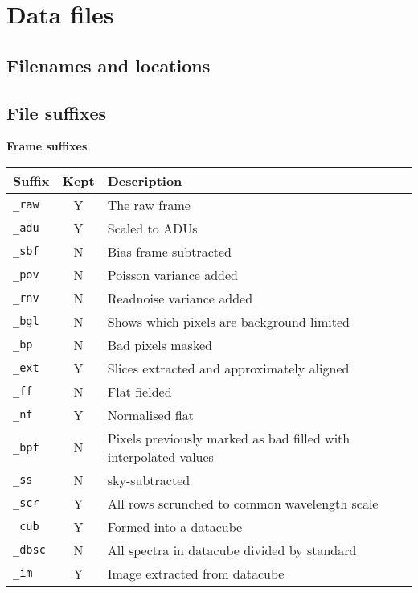 \documentclass[twoside,11pt,nolof]{starlink}
\begin{document}
\section{Data files}

\subsection{Filenames and locations}

\subsection{File suffixes}

\textbf{Frame suffixes}

\vspace{0.2cm}

\begin{tabular}{l c l}
\hline
Suffix & Kept & Description \hspace{9cm}  \\
\hline
\texttt{\_raw} & Y & The raw frame\\
\texttt{\_adu} & Y & Scaled to ADUs\\
\texttt{\_sbf} & N & Bias frame subtracted\\
\texttt{\_pov} & N & Poisson variance added\\
\texttt{\_rnv} & N & Readnoise variance added\\
\texttt{\_bgl} & N & Shows which pixels are background limited\\
\texttt{\_bp}  & N & Bad pixels masked\\
\texttt{\_ext} & Y & Slices extracted and approximately aligned\\
\texttt{\_ff}  & N & Flat fielded\\
\texttt{\_nf}  & Y & Normalised flat\\
\texttt{\_bpf} & N & Pixels previously marked as bad filled with
interpolated values\\
\texttt{\_ss}  & N & sky-subtracted\\
\texttt{\_scr} & Y & All rows scrunched to common wavelength scale\\
\texttt{\_cub} & Y & Formed into a datacube\\
\texttt{\_dbsc} & N & All spectra in datacube divided by standard\\
\texttt{\_im}  & Y & Image extracted from datacube\\
\hline
\end{tabular}
\end{document}
